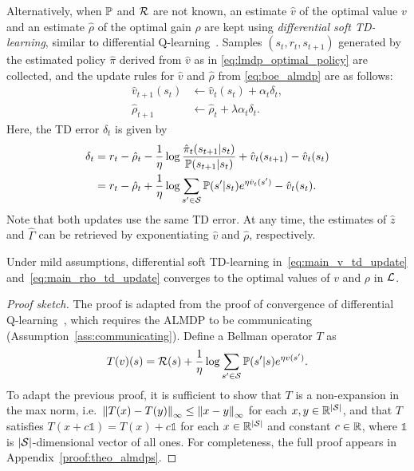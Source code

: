 Alternatively, when $\mathbb{P}$ and $\mathcal{R}$ are not known, an estimate $\hat v$ of the optimal value $v$ and an estimate $\hat\rho$ of the optimal gain $\rho$ are kept using \textit{differential soft TD-learning}, similar to differential Q-learning~\citep{Wan2021}. Samples $(s_t, r_t, s_{t+1})$ generated by the estimated policy $\hat\pi$ derived from $\hat v$ as in \eqref{eq:lmdp_optimal_policy} are collected, and the update rules for $\hat v$ and $\hat \rho$ from \eqref{eq:boe_almdp} are as follows:
\begin{align}
    \hat{v}_{t+1}(s_t) &\gets \hat{v}_t(s_t) + \alpha_t \delta_t,\label{eq:main_v_td_update}\\
    \hat{\rho}_{t+1} &\gets \hat{\rho}_t + \lambda \alpha_t \delta_t.\label{eq:main_rho_td_update}
    \end{align}
Here, the TD error $\delta_t$ is given by
\begin{align*}
\delta_t &= r_t - \hat{\rho}_t - \frac 1 \eta \log \frac {\hat{\pi}_t(s_{t+1}|s_t)} {\mathbb{P}(s_{t+1}|s_t)} + \hat{v}_t(s_{t+1}) - \hat{v}_t(s_t)\\
 &= r_t - \hat{\rho}_t + \frac 1 \eta \log \sum_{s'\in\mathcal{S}} \mathbb{P}(s'|s_t) e^{\eta \hat{v}_t(s')} - \hat{v}_t(s_t).
\end{align*}
Note that both updates use the same TD error. At any time, the estimates of $\hat z$ and $\widehat\Gamma$ can be retrieved by exponentiating $\hat v$ and $\hat \rho$, respectively.


\begin{theorem}
    Under mild assumptions, differential soft TD-learning in~\eqref{eq:main_v_td_update} and~\eqref{eq:main_rho_td_update} converges to the optimal values of $v$ and $\rho$ in $\mathcal{L}$. \label{theo:almdps}
\end{theorem}

\begin{proof}[Proof sketch]
The proof is adapted from the proof of convergence of differential Q-learning~\cite{Abounadi2001,Wan2021}, which requires the ALMDP to be communicating (Assumption~\ref{ass:communicating}).
Define a Bellman operator $T$ as
\[
T(v)(s) = \mathcal{R}(s) + \frac 1 \eta \log \sum_{s'\in\mathcal{S}} \mathbb{P}(s'|s) e^{ \eta v(s') }.
\]
To adapt the previous proof, it is sufficient to show that $T$ is a non-expansion in the max norm, i.e.~$\left\|T(x)-T(y)\right\|_\infty \leq \left\|x - y\right\|_\infty$ for each $x, y\in\mathbb{R}^{|\mathcal{S}|}$, and that $T$ satisfies $T(x + c\mathds{1}) = T(x) + c\mathds{1}$ for each $x\in\mathbb{R}^{|\mathcal{S}|}$ and constant $c\in\mathbb{R}$, where $\mathds{1}$ is $|\mathcal{S}|$-dimensional vector of all ones.
For completeness, the full proof appears in Appendix~\ref{proof:theo_almdps}.
\end{proof}

